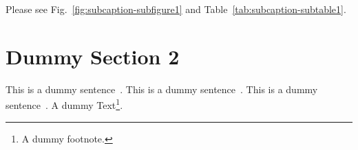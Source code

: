 \documentclass[twocolumn]{article}
\begin{document}
Please see Fig.~\ref{fig:subcaption-subfigure1} and Table~\ref{tab:subcaption-subtable1}.
 \section{Dummy Section 2}
\label{sec:dummy2}

This is a dummy sentence~\cite{Alpher02}. This is a dummy sentence~\cite{Alpher03}. This is a dummy sentence~\cite{Alpher04}. A dummy Text\footnote{A dummy footnote.}.
  




\end{document}
